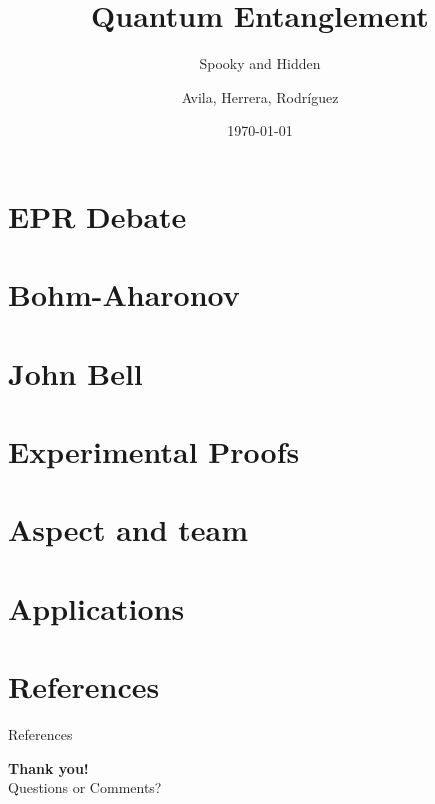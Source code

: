 \documentclass[aspectratio=169,sn-mathphys-num]{beamer}
\title{Quantum Entanglement}
\subtitle{Spooky and Hidden}
\author{Avila, Herrera, Rodríguez}
\institute{Universidad Distrital Francisco José de Caldas}
\date{\today}
\begin{document}
\begin{frame}
	\titlepage
\end{frame}

\section{EPR Debate}


\section{Bohm-Aharonov}


\section{John Bell}




\section{Experimental Proofs}


\section{Aspect and team}


\section{Applications}


\section{References}
\begin{frame}[allowframebreaks]{References}
	\printbibliography
	\nocite{*}
\end{frame}

\begin{frame}[plain]
	\centering
	\vspace{1cm}
	{\Huge \textbf{Thank you!}}\\[1cm]
	{\large Questions or Comments?}
\end{frame}

\begin{frame}
	\titlepage
\end{frame}
\end{document}
